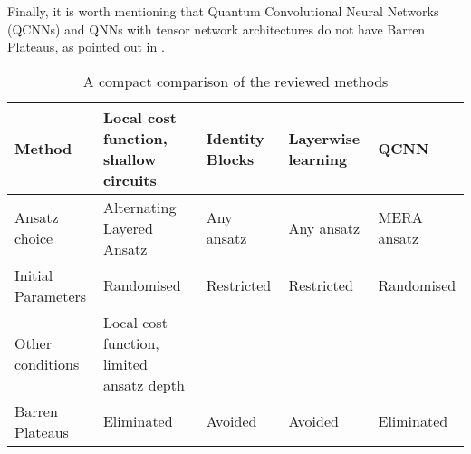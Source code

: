 Finally, it is worth mentioning that Quantum Convolutional Neural Networks (QCNNs) and QNNs with tensor network architectures do not have Barren Plateaus, as pointed out in \cite{congQuantumConvolutionalNeural2019}.

\begin{table}[]
    \centering
    \begin{tabular}{|l|p{2cm}|p{2cm}|p{2cm}|p{2cm}|}
        \hline
        Method              & Local cost function, shallow circuits & Identity Blocks   & Layerwise learning    & QCNN \\
        \hline
        Ansatz choice       & Alternating Layered Ansatz            & Any ansatz        & Any ansatz            & MERA ansatz\\
        \hline
        Initial Parameters  & Randomised                            & Restricted        & Restricted            & Randomised \\
        \hline
        Other conditions    & Local cost function, limited ansatz depth &               &                       & \\
        \hline
        Barren Plateaus     & Eliminated                            & Avoided           & Avoided             & Eliminated \\
        \hline
    \end{tabular}
    \caption{A compact comparison of the reviewed methods}
    \label{quick comparison of methods}
\end{table}